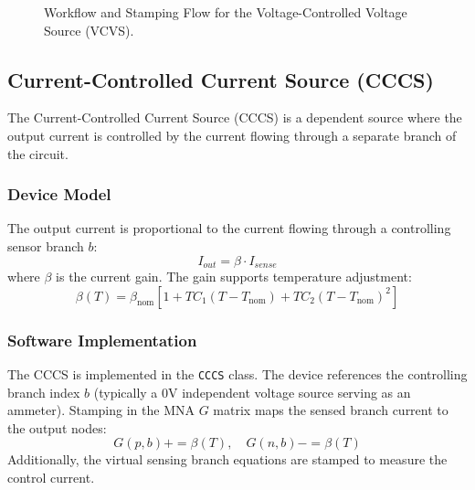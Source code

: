 \begin{figure}[H]
    \centering
    \caption{Workflow and Stamping Flow for the Voltage-Controlled Voltage Source (VCVS).}
    \label{fig:vcvs_flowchart}
\end{figure}

\subsection{Current-Controlled Current Source (CCCS)}
The Current-Controlled Current Source (CCCS) is a dependent source where the output current is controlled by the current flowing through a separate branch of the circuit.

\subsubsection{Device Model}
The output current is proportional to the current flowing through a controlling sensor branch $b$:
\begin{equation}
    I_{out} = \beta \cdot I_{sense}
\end{equation}
where $\beta$ is the current gain. The gain supports temperature adjustment:
\begin{equation}
    \beta(T) = \beta_{\text{nom}} \left[ 1 + TC_1 (T - T_{\text{nom}}) + TC_2 (T - T_{\text{nom}})^2 \right]
\end{equation}

\subsubsection{Software Implementation}
The CCCS is implemented in the \texttt{CCCS} class. The device references the controlling branch index $b$ (typically a 0V independent voltage source serving as an ammeter). 
Stamping in the MNA $G$ matrix maps the sensed branch current to the output nodes:
\begin{equation}
    G(p, b) \mathrel{{+}{=}} \beta(T), \quad G(n, b) \mathrel{{-}{=}} \beta(T)
\end{equation}
Additionally, the virtual sensing branch equations are stamped to measure the control current.

